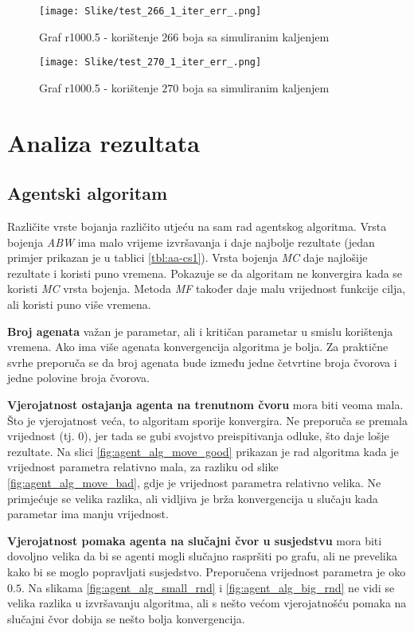 \documentclass[times, utf8, diplomski, numeric]{fer}
\begin{document}
\begin{figure}[htb]
	\texttt{[image: Slike/test\_266\_1\_iter\_err\_.png]}
	\caption{Graf r1000.5 - korištenje $266$ boja sa simuliranim kaljenjem}
	\label{fig:r1000.5-266}
\end{figure}

\begin{figure}[htb]
	\texttt{[image: Slike/test\_270\_1\_iter\_err\_.png]}
	\caption{Graf r1000.5 - korištenje $270$ boja sa simuliranim kaljenjem}
	\label{fig:r1000.5-270}
\end{figure}



\section{Analiza rezultata}

\subsection{Agentski algoritam}

Različite vrste bojanja različito utjeću na sam rad agentskog algoritma. Vrsta bojenja \emph{ABW} ima malo vrijeme izvršavanja i daje najbolje rezultate (jedan primjer prikazan je u tablici \ref{tbl:aa-cs1}). Vrsta bojenja \emph{MC} daje najlošije rezultate i koristi puno vremena. Pokazuje se da algoritam ne konvergira kada se koristi \emph{MC} vrsta bojenja. Metoda \emph{MF} također daje malu vrijednost funkcije cilja, ali koristi puno više vremena.

\textbf{Broj agenata} važan je parametar, ali i kritičan parametar u smislu korištenja vremena. Ako ima više agenata konvergencija algoritma je bolja. Za praktične svrhe preporuča se da broj agenata bude između jedne četvrtine broja čvorova i jedne polovine broja čvorova.

\textbf{Vjerojatnost ostajanja agenta na trenutnom čvoru} mora biti veoma mala. Što je vjerojatnost veća, to algoritam sporije konvergira. Ne preporuča se premala vrijednost (tj. $0$), jer tada se gubi svojstvo preispitivanja odluke, što daje lošje rezultate. Na slici \ref{fig:agent_alg_move_good} prikazan je rad algoritma kada je vrijednost parametra relativno mala, za razliku od slike \ref{fig:agent_alg_move_bad}, gdje je vrijednost parametra relativno velika. Ne primjećuje se velika razlika, ali vidljiva je brža konvergencija u slučaju kada parametar ima manju vrijednost.

\textbf{Vjerojatnost pomaka agenta na slučajni čvor u susjedstvu} mora biti dovoljno velika da bi se agenti mogli slučajno raspršiti po grafu, ali ne prevelika kako bi se moglo popravljati susjedstvo. Preporučena vrijednost parametra je oko $0.5$. Na slikama \ref{fig:agent_alg_small_rnd} i \ref{fig:agent_alg_big_rnd} ne vidi se velika razlika u izvršavanju algoritma, ali s nešto većom vjerojatnošću pomaka na slučajni čvor dobija se nešto bolja konvergencija.
\end{document}

